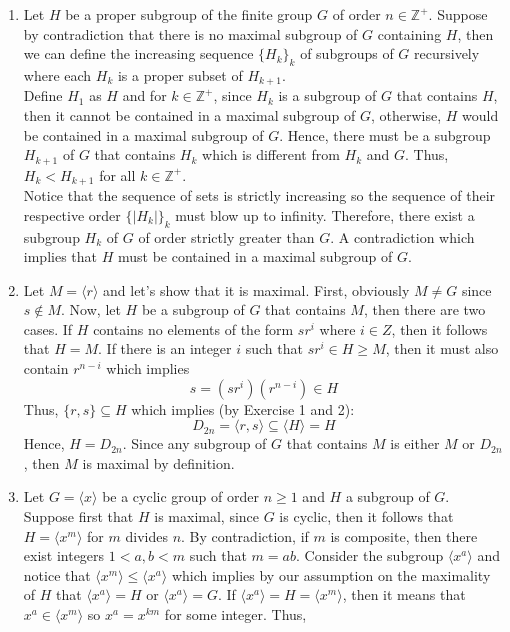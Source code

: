 \begin{solution}
    \begin{enumerate}[label = \textbf{(\alph*)}]
        \item Let $H$ be a proper subgroup of the finite group $G$ of order $n \in \mathbb{Z}^+$. Suppose by contradiction that there is no maximal subgroup of $G$ containing $H$, then we can define the increasing sequence $\{H_k\}_k$ of subgroups of $G$ recursively where each $H_k$ is a proper subset of $H_{k+1}$. \\
        Define $H_1$ as $H$ and for $k \in \mathbb{Z}^+$, since $H_k$ is a subgroup of $G$ that contains $H$, then it cannot be contained in a maximal subgroup of $G$, otherwise, $H$ would be contained in a maximal subgroup of $G$. Hence, there must be a subgroup $H_{k+1}$ of $G$ that contains $H_k$ which is different from $H_k$ and $G$. Thus, $H_k < H_{k+1}$ for all $k \in \mathbb{Z}^+$. \\
        Notice that the sequence of sets is strictly increasing so the sequence of their respective order $\{|H_k|\}_k$ must blow up to infinity. Therefore, there exist a subgroup $H_k$ of $G$ of order strictly greater than $G$. A contradiction which implies that $H$ must be contained in a maximal subgroup of $G$.
        \item Let $M = \langle r \rangle$ and let's show that it is maximal. First, obviously $M \neq G$ since $s \notin M$. Now, let $H$ be a subgroup of $G$ that contains $M$, then there are two cases. If $H$ contains no elements of the form $sr^i$ where $i\in Z$, then it follows that $H = M$. If there is an integer $i$ such that $sr^i \in H \geq M$, then it must also contain $r^{n-i}$ which implies
        $$s = (sr^i)(r^{n-i}) \in H$$
        Thus, $\{r,s\} \subseteq H$ which implies (by Exercise 1 and 2):
        $$D_{2n} = \langle r,s \rangle \subseteq \langle H \rangle = H$$
        Hence, $H = D_{2n}$. Since any subgroup of $G$ that contains $M$ is either $M$ or $D_{2n}$, then $M$ is maximal by definition.
        \item Let $G=\langle x \rangle$ be a cyclic group of order $n \geq 1$ and $H$ a subgroup of $G$. Suppose first that $H$ is maximal, since $G$ is cyclic, then it follows that $H = \langle x^m \rangle$ for $m$ divides $n$. By contradiction, if $m$ is composite, then there exist integers $1 < a,b < m$ such that $m = ab$. Consider the subgroup $\langle x^a \rangle$ and notice that $\langle x^m \rangle \leq \langle x^a \rangle$ which implies by our assumption on the maximality of $H$ that $\langle x^a \rangle = H$ or $\langle x^a \rangle = G$. If $\langle x^a \rangle = H = \langle x^m \rangle$, then it means that $x^a \in \langle x^m \rangle$ so $x^a = x^{km}$ for some integer. Thus,

\end{enumerate}
\end{solution}
